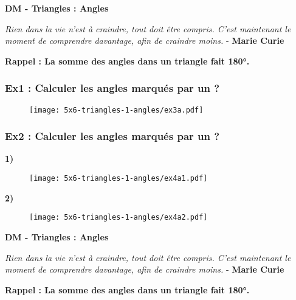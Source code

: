 



\textbf{DM - Triangles : Angles}

\begin{center}
  \textit{Rien dans la vie n'est à craindre, tout doit être compris. C'est maintenant le moment de comprendre davantage, afin de craindre moins.}  - \textbf{Marie Curie}
\end{center}

\textbf{Rappel : La somme des angles dans un triangle fait 180°.}

\subsubsection*{Ex1 : Calculer les angles marqués par un ?}

\begin{figure}[H]
  \centering
  \texttt{[image: 5x6-triangles-1-angles/ex3a.pdf]}
\end{figure}

\Pointilles[6]

\subsubsection*{Ex2 : Calculer les angles marqués par un ?}

\begin{multicols}{2}
  \textbf{1)}
  \begin{figure}[H]
    \centering
    \texttt{[image: 5x6-triangles-1-angles/ex4a1.pdf]}
  \end{figure} \columnbreak

  \textbf{2)}
  \begin{figure}[H]
    \centering
    \texttt{[image: 5x6-triangles-1-angles/ex4a2.pdf]}
  \end{figure}
\end{multicols}

\Pointilles[16]

\newpage

\textbf{DM - Triangles : Angles}

\begin{center}
  \textit{Rien dans la vie n'est à craindre, tout doit être compris. C'est maintenant le moment de comprendre davantage, afin de craindre moins.}  - \textbf{Marie Curie}
\end{center}

\textbf{Rappel : La somme des angles dans un triangle fait 180°.}

